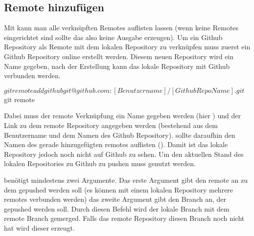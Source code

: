 \subsection{Remote hinzufügen}
Mit  kann man alle verknüpften Remotes auflisten lassen (wenn keine Remotes eingerichtet sind sollte das also keine Ausgabe erzeugen). Um ein Github Repository als Remote mit dem lokalen Repository zu verknüpfen muss zuerst ein Github Repository online erstellt werden. Diesem neuen Repository wird ein Name gegeben, nach der Erstellung kann das lokale Repository mit Github verbunden werden.
\begin{mplisting}
$ git remote add github git@github.com:[Benutzername]/[Github Repo Name].git
$ git remote
\end{mplisting} 
Dabei muss der remote Verknüpfung ein Name gegeben werden (hier ) und der Link zu dem remote Repository angegeben werden (bestehend aus dem Benutzername und dem Namen des Github Repository).  sollte daraufhin den Namen des gerade hinzugefügten remotes auflisten (). Damit ist das lokale Repository jedoch noch nicht auf Github zu sehen. Um den aktuellen Stand des lokalen Repositories zu Github zu pushen muss  genutzt werden.
 benötigt mindestens zwei Argumente. Das erste Argument gibt den remote an zu dem gepushed werden soll (es können mit einem lokalen Repository mehrere remotes verbunden werden) das zweite Argument gibt den Branch an, der gepushed werden soll. Durch diesen Befehl wird der lokale Branch mit dem remote Branch gemerged. Falls das remote Repository diesen Branch noch nicht hat wird dieser erzeugt.